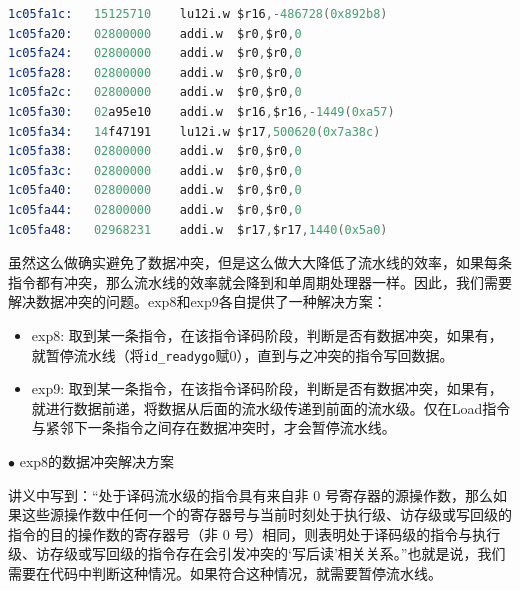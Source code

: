 \documentclass[UTF8]{report}
\begin{document}
\begin{lstlisting}[language=s]
1c05fa1c:	15125710 	lu12i.w	$r16,-486728(0x892b8)
1c05fa20:	02800000 	addi.w	$r0,$r0,0
1c05fa24:	02800000 	addi.w	$r0,$r0,0
1c05fa28:	02800000 	addi.w	$r0,$r0,0
1c05fa2c:	02800000 	addi.w	$r0,$r0,0
1c05fa30:	02a95e10 	addi.w	$r16,$r16,-1449(0xa57)
1c05fa34:	14f47191 	lu12i.w	$r17,500620(0x7a38c)
1c05fa38:	02800000 	addi.w	$r0,$r0,0
1c05fa3c:	02800000 	addi.w	$r0,$r0,0
1c05fa40:	02800000 	addi.w	$r0,$r0,0
1c05fa44:	02800000 	addi.w	$r0,$r0,0
1c05fa48:	02968231 	addi.w	$r17,$r17,1440(0x5a0)
\end{lstlisting}

虽然这么做确实避免了数据冲突，但是这么做大大降低了流水线的效率，如果每条指令都有冲突，那么流水线的效率就会降到和单周期处理器一样。因此，我们需要解决数据冲突的问题。exp8和exp9各自提供了一种解决方案：

\begin{itemize}
    \item exp8: 取到某一条指令，在该指令译码阶段，判断是否有数据冲突，如果有，就暂停流水线（将\texttt{id\_readygo}赋0），直到与之冲突的指令写回数据。
    \item exp9: 取到某一条指令，在该指令译码阶段，判断是否有数据冲突，如果有，就进行数据前递，将数据从后面的流水级传递到前面的流水级。仅在Load指令与紧邻下一条指令之间存在数据冲突时，才会暂停流水线。
\end{itemize}

\noindent
$\bullet$ exp8的数据冲突解决方案

讲义中写到：“处于译码流水级的指令具有来自非 0 号寄存器的源操作数，那么如果这些源操作数中任何一个的寄存器号与当前时刻处于执行级、访存级或写回级的指令的目的操作数的寄存器号（非 0 号）相同，则表明处于译码级的指令与执行级、访存级或写回级的指令存在会引发冲突的‘写后读’相关关系。”也就是说，我们需要在代码中判断这种情况。如果符合这种情况，就需要暂停流水线。
\end{document}
